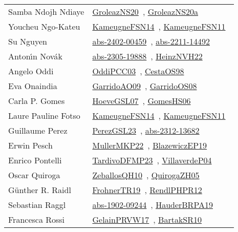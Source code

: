 {\begin{longtable}{p{4cm}p{20cm}}
Samba Ndojh Ndiaye & \href{works/GroleazNS20.pdf}{GroleazNS20}~\cite{GroleazNS20}, \href{works/GroleazNS20a.pdf}{GroleazNS20a}~\cite{GroleazNS20a}\\
Youcheu Ngo{-}Kateu & \href{works/KameugneFSN14.pdf}{KameugneFSN14}~\cite{KameugneFSN14}, \href{works/KameugneFSN11.pdf}{KameugneFSN11}~\cite{KameugneFSN11}\\
Su Nguyen & \href{works/abs-2402-00459.pdf}{abs-2402-00459}~\cite{abs-2402-00459}, \href{works/abs-2211-14492.pdf}{abs-2211-14492}~\cite{abs-2211-14492}\\
Anton{\'{\i}}n Nov{\'{a}}k & \href{works/abs-2305-19888.pdf}{abs-2305-19888}~\cite{abs-2305-19888}, \href{works/HeinzNVH22.pdf}{HeinzNVH22}~\cite{HeinzNVH22}\\
Angelo Oddi & \href{works/OddiPCC03.pdf}{OddiPCC03}~\cite{OddiPCC03}, \href{works/CestaOS98.pdf}{CestaOS98}~\cite{CestaOS98}\\
Eva Onaindia & \href{works/GarridoAO09.pdf}{GarridoAO09}~\cite{GarridoAO09}, \href{works/GarridoOS08.pdf}{GarridoOS08}~\cite{GarridoOS08}\\
Carla P. Gomes & \href{works/HoeveGSL07.pdf}{HoeveGSL07}~\cite{HoeveGSL07}, \href{works/GomesHS06.pdf}{GomesHS06}~\cite{GomesHS06}\\
Laure Pauline Fotso & \href{works/KameugneFSN14.pdf}{KameugneFSN14}~\cite{KameugneFSN14}, \href{works/KameugneFSN11.pdf}{KameugneFSN11}~\cite{KameugneFSN11}\\
Guillaume Perez & \href{works/PerezGSL23.pdf}{PerezGSL23}~\cite{PerezGSL23}, \href{works/abs-2312-13682.pdf}{abs-2312-13682}~\cite{abs-2312-13682}\\
Erwin Pesch & \href{works/MullerMKP22.pdf}{MullerMKP22}~\cite{MullerMKP22}, \href{}{BlazewiczEP19}~\cite{BlazewiczEP19}\\
Enrico Pontelli & \href{works/TardivoDFMP23.pdf}{TardivoDFMP23}~\cite{TardivoDFMP23}, \href{}{VillaverdeP04}~\cite{VillaverdeP04}\\
Oscar Quiroga & \href{works/ZeballosQH10.pdf}{ZeballosQH10}~\cite{ZeballosQH10}, \href{works/QuirogaZH05.pdf}{QuirogaZH05}~\cite{QuirogaZH05}\\
G{\"{u}}nther R. Raidl & \href{works/FrohnerTR19.pdf}{FrohnerTR19}~\cite{FrohnerTR19}, \href{works/RendlPHPR12.pdf}{RendlPHPR12}~\cite{RendlPHPR12}\\
Sebastian Raggl & \href{works/abs-1902-09244.pdf}{abs-1902-09244}~\cite{abs-1902-09244}, \href{works/HauderBRPA19.pdf}{HauderBRPA19}~\cite{HauderBRPA19}\\
Francesca Rossi & \href{works/GelainPRVW17.pdf}{GelainPRVW17}~\cite{GelainPRVW17}, \href{works/BartakSR10.pdf}{BartakSR10}~\cite{BartakSR10}\\

\end{longtable}}
